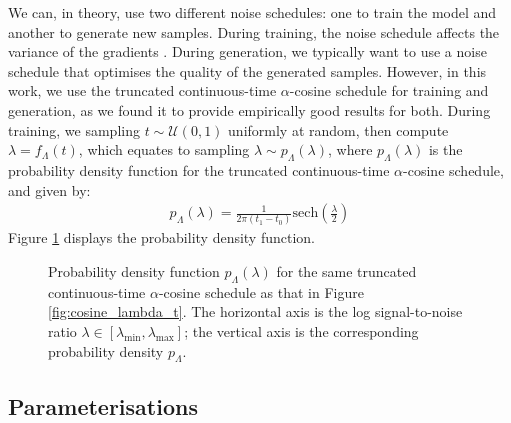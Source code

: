 \documentclass[ oneside,%
                    author={George Herbert},
                    degree={MSci},
                     title={Diffusion Models for Time-Evolving Precipitation Fields},
                  subtitle={}]{dissertation}
\begin{document}
We can, in theory, use two different noise schedules: one to train the model and another to generate new samples. During training, the noise schedule affects the variance of the gradients \cite{Understanding_Diffusion_Objective_Kingma}. During generation, we typically want to use a noise schedule that optimises the quality of the generated samples. However, in this work, we use the truncated continuous-time $\alpha$-cosine schedule for training and generation, as we found it to provide empirically good results for both. During training, we sampling $t\sim\mathcal{U}(0,1)$ uniformly at random, then compute $\lambda=f_\Lambda(t)$, which equates to sampling $\lambda\sim p_\Lambda(\lambda)$, where $p_\Lambda(\lambda)$ is the probability density function for the truncated continuous-time $\alpha$-cosine schedule, and given by:
\begin{align}
      p_\Lambda(\lambda)=\frac{1}{2\pi(t_1-t_0)}\mathrm{sech}\left(\frac{\lambda}{2}\right)
\end{align}
Figure \ref{fig:p_lambda} displays the probability density function.
\begin{figure}[htbp]
      \centering
      \caption{Probability density function $p_\Lambda(\lambda)$ for the same truncated continuous-time $\alpha$-cosine schedule as that in Figure \ref{fig:cosine_lambda_t}. The horizontal axis is the log signal-to-noise ratio $\lambda\in[\lambda_{\min}, \lambda_{\max}]$; the vertical axis is the corresponding probability density $p_\Lambda$.}
      \label{fig:p_lambda}
\end{figure}

\subsection{Parameterisations}
\label{sec:background_diffusion_parameterisations}
\end{document}
